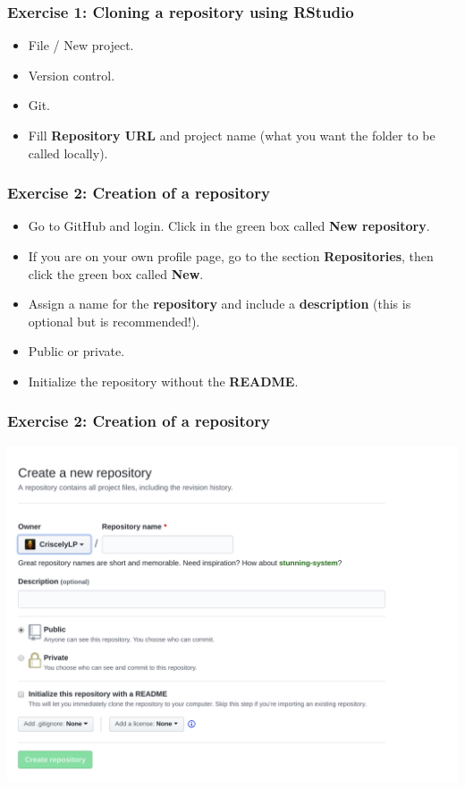 \documentclass[svgnames]{beamer}
\begin{document}
\begin{frame}[fragile]
\frametitle{Exercise 1: Cloning a repository using RStudio}
\begin{itemize}
    \item File / New project. 
    \item Version control.
    \item Git.
    \item Fill \textbf{Repository URL} and project name (what you want the folder to be called locally).
\end{itemize}
\end{frame}


\begin{frame}
\frametitle{Exercise 2: Creation of a repository}

\begin{itemize}
    \item Go to GitHub and login. Click in the green box called \textbf{New repository}. 
    \item If you are on your own profile page, go to the section \textbf{Repositories}, then click the green box called \textbf{New}.
    \item Assign a name for the \textbf{repository} and include a \textbf{description} (this is optional but is recommended!).
    \item Public or private.
    \item Initialize the repository without the \textbf{README}.
    
\end{itemize}
\end{frame}

\begin{frame}[fragile]
\frametitle{Exercise 2: Creation of a repository}
\begin{center}
\includegraphics[scale=0.27]{img/github_makeRepo.png}
\end{center}
\end{frame}
\end{document}

